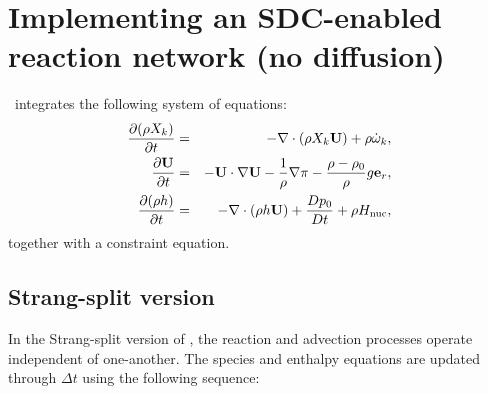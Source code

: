 \section{Implementing an SDC-enabled reaction network (no diffusion)}

\maestro\ integrates the following system of equations:
\begin{eqnarray}
\frac{\partial(\rho X_k)}{\partial t} &=& 
    -\nabla\cdot(\rho X_k{\bf U}) + \rho\dot{\omega}_k,\label{eq:species}\\
\frac{\partial{\bf U}}{\partial t} &=& 
    -{\bf U}\cdot\nabla{\bf U}  - \frac{1}{\rho}\nabla\pi 
    - \frac{\rho-\rho_0}{\rho} g{\bf e}_r,\label{eq:momentum}\\
\frac{\partial(\rho h)}{\partial t} &=& 
    -\nabla\cdot(\rho h{\bf U}) + \frac{Dp_0}{Dt} 
    + \rho{H_{\rm nuc}} ,\label{eq:enthalpy}
\end{eqnarray}
together with a constraint equation.

\subsection{Strang-split version}

In the Strang-split version of \maestro, the reaction and advection
processes operate independent of one-another.  The species and
enthalpy equations are updated through $\Delta t$ using the following
sequence:

